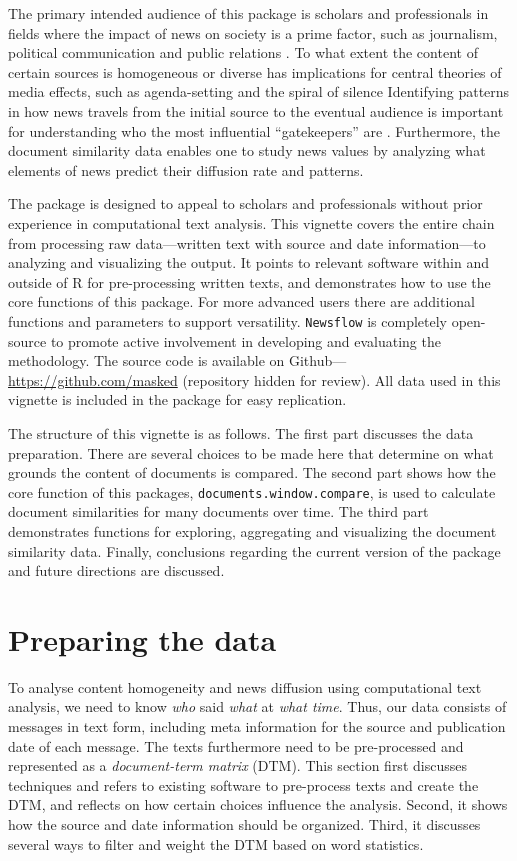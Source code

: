 The primary intended audience of this package is scholars and
professionals in fields where the impact of news on society is a prime
factor, such as journalism, political communication and public relations
\citep{baum08, boczkowski07, ragas14}. To what extent the content of
certain sources is homogeneous or diverse has implications for central
theories of media effects, such as agenda-setting and the spiral of
silence \citep{bennett08, blumler99} Identifying patterns in how news
travels from the initial source to the eventual audience is important
for understanding who the most influential ``gatekeepers'' are
\citep{shoemaker09}. Furthermore, the document similarity data enables
one to study news values \citep{galtung65} by analyzing what elements of
news predict their diffusion rate and patterns.

The package is designed to appeal to scholars and professionals without
prior experience in computational text analysis. This vignette covers
the entire chain from processing raw data---written text with source and
date information---to analyzing and visualizing the output. It points to
relevant software within and outside of R for pre-processing written
texts, and demonstrates how to use the core functions of this package.
For more advanced users there are additional functions and parameters to
support versatility. \texttt{Newsflow} is completely open-source to
promote active involvement in developing and evaluating the methodology.
The source code is available on Github---\url{https://github.com/masked}
(repository hidden for review). All data used in this vignette is
included in the package for easy replication.

The structure of this vignette is as follows. The first part discusses
the data preparation. There are several choices to be made here that
determine on what grounds the content of documents is compared. The
second part shows how the core function of this packages,
\texttt{documents.window.compare}, is used to calculate document
similarities for many documents over time. The third part demonstrates
functions for exploring, aggregating and visualizing the document
similarity data. Finally, conclusions regarding the current version of
the package and future directions are discussed.

\section{Preparing the data}

To analyse content homogeneity and news diffusion using computational
text analysis, we need to know \emph{who} said \emph{what} at
\emph{what time}. Thus, our data consists of messages in text form,
including meta information for the source and publication date of each
message. The texts furthermore need to be pre-processed and represented
as a \emph{document-term matrix} (DTM). This section first discusses
techniques and refers to existing software to pre-process texts and
create the DTM, and reflects on how certain choices influence the
analysis. Second, it shows how the source and date information should be
organized. Third, it discusses several ways to filter and weight the DTM
based on word statistics.

